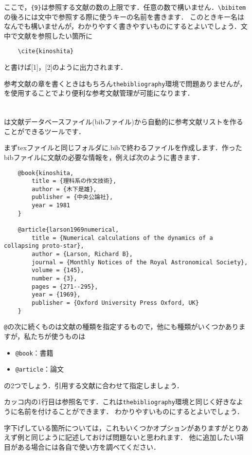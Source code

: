 \documentclass[a4paper,11pt]{jsreport}
\numberwithin{equation}{section}
\theoremstyle{definition}
\begin{document}
ここで，\verb|{9}|は参照する文献の数の上限です．任意の数で構いません．\verb|\bibitem|の後ろには文中で参照する際に使うキーの名前を書きます．
このときキー名はなんでも構いませんが，わかりやすく書きやすいものにするとよいでしょう．文中で文献を参照したい箇所に
\begin{verbatim}
    \cite{kinoshita}
\end{verbatim}
と書けば[1]，[2]のように出力されます．

参考文献の章を書くときはもちろん\verb|thebibliography|環境で問題ありませんが，
\BibTeX を使用することでより便利な参考文献管理が可能になります．

\section{\BibTeX}

 {\BibTeX}は文献データベースファイル(bibファイル)から自動的に参考文献リストを作ることができるツールです\cite{bibunsyo}．

まずtexファイルと同じフォルダに.bibで終わるファイルを作成します．作ったbibファイルに文献の必要な情報を，例えば次のように書きます．
\begin{verbatim}
    @book{kinoshita,
        title = {理科系の作文技術},
        author = {木下是雄},
        publisher = {中央公論社},
        year = 1981
    }

    @article{larson1969numerical,
        title = {Numerical calculations of the dynamics of a collapsing proto-star},
        author = {Larson, Richard B},
        journal = {Monthly Notices of the Royal Astronomical Society},
        volume = {145},
        number = {3},
        pages = {271--295},
        year = {1969},
        publisher = {Oxford University Press Oxford, UK}
    }
\end{verbatim}

\verb|@|の次に続くものは文献の種類を指定するもので，他にも種類がいくつかありますが，私たちが使うものは
\begin{itemize}
    \item \verb|@book|：書籍
    \item \verb|@article|：論文
\end{itemize}
の2つでしょう．引用する文献に合わせて指定しましょう．

カッコ内の1行目は参照名です．これは\verb|thebibliography|環境と同じく好きなように名前を付けることができます．
わかりやすいものにするとよいでしょう．

字下げしている箇所については，これもいくつかオプションがありますがとりあえず例と同じように記述しておけば問題ないと思われます．
他に追加したい項目がある場合には各自で使い方を調べてください．
\end{document}

